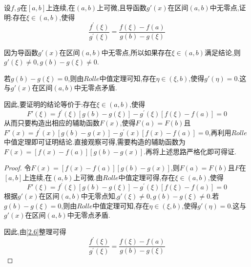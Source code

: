 \documentclass[lang=cn,newtx,10pt,scheme=chinese]{../Template/elegantbook}
\begin{document}
\begin{exercise}
设\(f,g\)在\([a,b]\)上连续,在\((a,b)\)上可微,且导函数\(g'(x)\)在区间\((a,b)\)中无零点,证明:存在\(\xi\in(a,b)\),使得
\begin{equation}
\frac{f^{\prime}(\xi)}{g^{\prime}(\xi)}=\frac{f(\xi)-f(a)}{g(b)-g(\xi)}
    \nonumber
\end{equation}

\begin{note}
    因为导函数\(g'(x)\)在区间\((a,b)\)中无零点,所以如果存在$\xi\in(a,b)$满足结论,则$g'(\xi)\ne0,g(b)-g(\xi)\ne0$.

    若$g(b)-g(\xi)=0$,则由$Rolle$中值定理可知,存在$\eta\in(\xi,b)$,使得$g'(\eta)=0$.这与\(g'(x)\)在区间\((a,b)\)中无零点矛盾.
    
    因此,要证明的结论等价于:存在$\xi\in(a,b)$,使得
    \begin{equation}
    F'(\xi)=f^{\prime}(\xi )\left[ g(b)-g(\xi ) \right] -g^{\prime}(\xi )\left[ f(\xi )-f(a) \right] =0
        \nonumber
    \end{equation}
    从而只要构造出相应的辅助函数$F(x)$,使得$F(a)=F(b)$且$F'(x)=f^{\prime}(x)\left[ g(b)-g(x) \right] -g^{\prime}(x)\left[ f(x)-f(a) \right] =0$,再利用$Rolle$中值定理即可证明结论.直接观察可得,需要构造的辅助函数为$F(x)=[f(x)-f(a)][g(b)-g(x)]$.再将上述思路严格化即可得证.
\end{note}

    \begin{proof}
    令$F(x)=[f(x)-f(a)][g(b)-g(x)]$,则$F(a)=F(b)$且\(F\)在\([a,b]\)上连续,在\((a,b)\)上可微.由$Rolle$中值定理可得,存在$\xi\in(a,b)$,使得
    \begin{equation}\label{2.6}
    F'(\xi)=f^{\prime}(\xi )\left[ g(b)-g(\xi ) \right] -g^{\prime}(\xi )\left[ f(\xi )-f(a) \right] =0
    \end{equation}
    根据$g'(x)$在区间$(a,b)$中无零点知,$g'(\xi)\ne0,g(b)-g(\xi)\ne0$.若$g(b)-g(\xi)=0$,则由$Rolle$中值定理可知,存在$\eta\in(\xi,b)$,使得$g'(\eta)=0$.这与\(g'(x)\)在区间\((a,b)\)中无零点矛盾.

    因此,由\eqref{2.6}整理可得
    \begin{equation}
\frac{f^{\prime}(\xi)}{g^{\prime}(\xi)}=\frac{f(\xi)-f(a)}{g(b)-g(\xi)}
    \nonumber
\end{equation}
    \end{proof}
\end{exercise}
\end{document}
